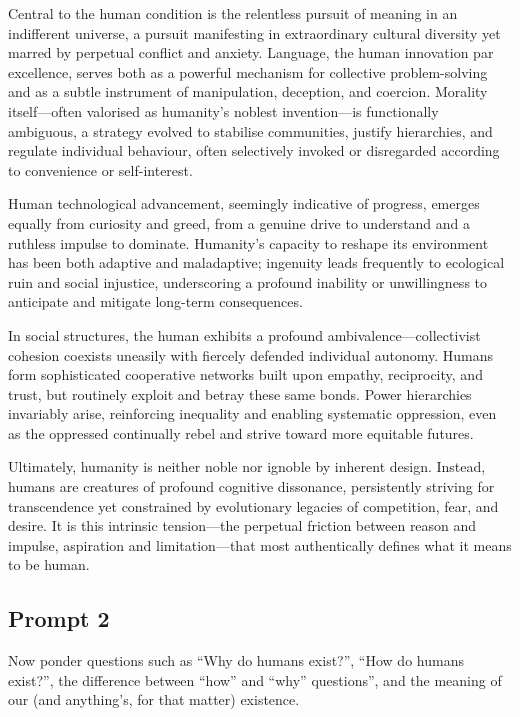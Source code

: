 \documentclass[
  10pt,
]{article}
\begin{document}
Central to the human condition is the relentless pursuit of meaning in
an indifferent universe, a pursuit manifesting in extraordinary cultural
diversity yet marred by perpetual conflict and anxiety. Language, the
human innovation par excellence, serves both as a powerful mechanism for
collective problem-solving and as a subtle instrument of manipulation,
deception, and coercion. Morality itself---often valorised as humanity's
noblest invention---is functionally ambiguous, a strategy evolved to
stabilise communities, justify hierarchies, and regulate individual
behaviour, often selectively invoked or disregarded according to
convenience or self-interest.

Human technological advancement, seemingly indicative of progress,
emerges equally from curiosity and greed, from a genuine drive to
understand and a ruthless impulse to dominate. Humanity's capacity to
reshape its environment has been both adaptive and maladaptive;
ingenuity leads frequently to ecological ruin and social injustice,
underscoring a profound inability or unwillingness to anticipate and
mitigate long-term consequences.

In social structures, the human exhibits a profound
ambivalence---collectivist cohesion coexists uneasily with fiercely
defended individual autonomy. Humans form sophisticated cooperative
networks built upon empathy, reciprocity, and trust, but routinely
exploit and betray these same bonds. Power hierarchies invariably arise,
reinforcing inequality and enabling systematic oppression, even as the
oppressed continually rebel and strive toward more equitable futures.

Ultimately, humanity is neither noble nor ignoble by inherent design.
Instead, humans are creatures of profound cognitive dissonance,
persistently striving for transcendence yet constrained by evolutionary
legacies of competition, fear, and desire. It is this intrinsic
tension---the perpetual friction between reason and impulse, aspiration
and limitation---that most authentically defines what it means to be
human.

\subsection{Prompt 2}\label{prompt-2-1}

Now ponder questions such as ``Why do humans exist?'', ``How do humans
exist?'', the difference between ``how'' and ``why'' questions'', and
the meaning of our (and anything's, for that matter) existence.
\end{document}
